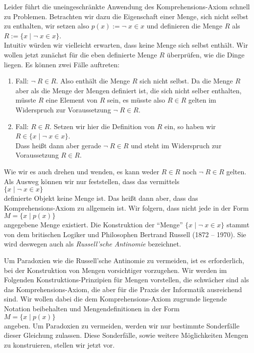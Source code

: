 Leider führt die uneingeschränkte Anwendung des Komprehensions-Axiom schnell zu
Problemen.  Betrachten wir dazu die Eigenschaft einer Menge, sich nicht selbst zu enthalten, wir
setzen also $p(x) := \neg\; x \in x$ und definieren die Menge $R$ als \\[0.2cm]
\hspace*{1.3cm} $R := \{ x \;|\; \neg\; x \in x \}$.  \\[0.2cm]
Intuitiv würden wir vielleicht erwarten, dass keine Menge sich selbst enthält.  Wir wollen
jetzt zunächst für die eben definierte Menge $R$ überprüfen, wie die Dinge liegen.
Es können zwei Fälle auftreten:
\begin{enumerate}
\item Fall: $\neg\; R \in R$. Also enthält die Menge $R$ sich nicht selbst.
      Da die Menge $R$ aber als die Menge der Mengen definiert ist, die sich nicht selber
      enthalten, müsste $R$ eine Element von $R$ sein, es müsste also
      $R \in R$ gelten im Widerspruch zur Voraussetzung $\neg\; R \in R$.
\item Fall: $R \in R$. Setzen wir hier die Definition von $R$ ein, so haben wir \\[0.2cm]
      \hspace*{1.3cm}  $R \in \{ x \;|\; \neg\; x \in x \}$. \\[0.2cm]
      Dass heißt dann aber gerade $\neg\; R \in R$ und steht im Widerspruch zur
      Voraussetzung $R \in R$.
\end{enumerate}
Wie wir es auch drehen und wenden, es kann weder $R \in R$ noch $\neg\; R \in R$ gelten. 
Als Ausweg können wir nur feststellen, dass das vermittels \\[0.2cm]
\hspace*{1.3cm} $\{ x \mid \neg\; x \in x \}$ \\[0.2cm]
definierte Objekt keine Menge ist.
Das heißt dann aber, dass das Komprehensions-Axiom
zu allgemein ist.  Wir folgern, dass nicht jede  in der Form \\[0.2cm]
\hspace*{1.3cm} $M = \{ x \mid p(x) \}$ \\[0.2cm]
angegebene Menge  existiert.  Die Konstruktion der ``Menge''
$\{x \mid \neg\; x \in x\}$ stammt von dem britischen Logiker und Philosophen Bertrand
Russell (1872 -- 1970).  Sie wird deswegen auch als \emph{Russell'sche Antinomie} bezeichnet.


Um  Paradoxien wie die Russell'sche Antinomie  zu vermeiden, ist es erforderlich, bei der
Konstruktion von Mengen vorsichtiger vorzugehen.
Wir werden im Folgenden Konstruktions-Prinzipien für Mengen vorstellen,
die schwächer sind als das Komprehensions-Axiom, die aber für die Praxis der Informatik
ausreichend sind.  Wir wollen dabei die dem Komprehensions-Axiom zugrunde liegende Notation 
beibehalten und Mengendefinitionen in der Form \\[0.2cm]
\hspace*{1.3cm} $M = \{ x \mid p(x) \}$  \\[0.2cm]
angeben.  Um Paradoxien zu vermeiden, werden wir nur bestimmte
Sonderfälle dieser Gleichung zulassen.  Diese Sonderfälle, sowie weitere Möglichkeiten
Mengen zu konstruieren, stellen wir jetzt vor.


